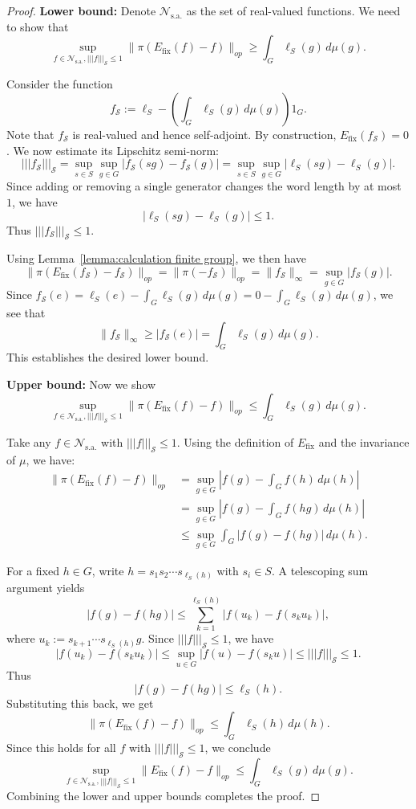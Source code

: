 \documentclass[11pt,reqno]{amsart}
\numberwithin{equation}{section}
\newcommand{\mc}{\mathcal}
\newcommand{\fix}{\mathrm{fix}}
\begin{document}
\begin{proof}
\textbf{Lower bound:} Denote $\mc N_{\mathrm{s.a.}}$ as the set of real-valued functions. We need to show that 
\[
    \sup_{f \in \mc N_{\mathrm{s.a.}}, |||f|||_{\mc S} \le 1} \|\pi(E_{\fix}(f) - f)\|_{op} \ge \int_G \ell_{S}(g) \, d\mu(g).
\]

Consider the function 
\[
    f_{\mc S} := \ell_{S} - \left(\int_G \ell_{S}(g)\, d\mu(g)\right) 1_G.
\]
Note that $f_{\mc S}$ is real-valued and hence self-adjoint. By construction, $E_{\fix}(f_{\mc S}) = 0$. We now estimate its Lipschitz semi-norm:
\[
    |||f_{\mc S}|||_{\mc S} = \sup_{s \in S} \sup_{g \in G} |f_{\mc S}(sg) - f_{\mc S}(g)| = \sup_{s \in S} \sup_{g \in G} |\ell_{S}(sg) - \ell_{S}(g)|.
\]
Since adding or removing a single generator changes the word length by at most $1$, we have 
\[
    |\ell_{S}(sg) - \ell_{S}(g)| \le 1.
\]
Thus $|||f_{\mc S}|||_{\mc S} \le 1$.

Using Lemma~\ref{lemma:calculation finite group}, we then have
\[
    \|\pi(E_{\fix}(f_{\mc S}) - f_{\mc S})\|_{op} = \|\pi(-f_{\mc S})\|_{op} = \|f_{\mc S}\|_{\infty} = \sup_{g \in G} |f_{\mc S}(g)|.
\]
Since $f_{\mc S}(e) = \ell_{S}(e) - \int_G \ell_{S}(g)\, d\mu(g) = 0 - \int_G \ell_{S}(g)\, d\mu(g)$, we see that
\[
    \|f_{\mc S}\|_{\infty} \ge |f_{\mc S}(e)| = \int_G \ell_{S}(g)\, d\mu(g).
\]
This establishes the desired lower bound.

\medskip

\textbf{Upper bound:} Now we show
\[
    \sup_{f \in \mc N_{\mathrm{s.a.}}, |||f|||_{\mc S} \le 1} \|\pi(E_{\fix}(f) - f)\|_{op} \le \int_G \ell_{S}(g) \, d\mu(g).
\]

Take any $f \in \mc N_{\mathrm{s.a.}}$ with $|||f|||_{\mc S} \le 1$. Using the definition of $E_{\fix}$ and the invariance of $\mu$, we have:
\begin{align*}
    \|\pi(E_{\fix}(f) - f)\|_{op} &= \sup_{g \in G} \left| f(g) - \int_G f(h) \, d\mu(h) \right| \\
    &= \sup_{g \in G} \left| f(g) - \int_G f(hg) \, d\mu(h) \right| \\
    &\le \sup_{g \in G} \int_G |f(g) - f(hg)| \, d\mu(h).
\end{align*}

For a fixed $h \in G$, write $h = s_1 s_2 \cdots s_{\ell_S(h)}$ with $s_i \in S$. A telescoping sum argument yields
\[
    |f(g) - f(hg)| \le \sum_{k=1}^{\ell_S(h)} |f(u_k) - f(s_k u_k)|,
\]
where $u_k := s_{k+1}\cdots s_{\ell_S(h)}g$. Since $|||f|||_{\mc S} \le 1$, we have
\[
    |f(u_k) - f(s_k u_k)| \le \sup_{u \in G} |f(u) - f(s_k u)| \le |||f|||_{\mc S} \le 1.
\]
Thus
\[
    |f(g) - f(hg)| \le \ell_{S}(h).
\]
Substituting this back, we get
\[
    \|\pi(E_{\fix}(f) - f)\|_{op} \le \int_G \ell_{S}(h) \, d\mu(h).
\]
Since this holds for all $f$ with $|||f|||_{\mc S} \le 1$, we conclude
\[
    \sup_{f \in \mc N_{\mathrm{s.a.}}, |||f|||_{\mc S} \le 1} \|E_{\fix}(f) - f\|_{op} \le \int_G \ell_{S}(g) \, d\mu(g).
\]
Combining the lower and upper bounds completes the proof.
\end{proof}
\end{document}
